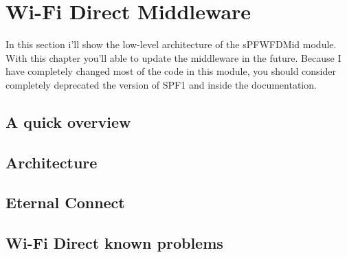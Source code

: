 \chapter{Wi-Fi Direct Middleware}
\label{chap2}
\thispagestyle{empty}

\noindent In this section i'll show the low-level architecture of the sPFWFDMid module. 
With this chapter you'll able to update the middleware in the future. 
Because I have completely changed most of the code in this module, you should consider completely deprecated the version of SPF1 and inside the documentation.


\section{A quick overview}


\section{Architecture}


\section{Eternal Connect}


\section{Wi-Fi Direct known problems}